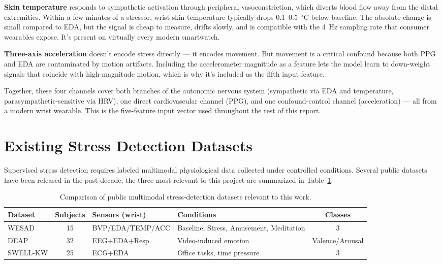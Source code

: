 \textbf{Skin temperature} responds to sympathetic activation through
peripheral vasoconstriction, which diverts blood flow away from the
distal extremities. Within a few minutes of a stressor, wrist skin
temperature typically drops 0.1--0.5~$^\circ$C below baseline. The
absolute change is small compared to EDA, but the signal is cheap
to measure, drifts slowly, and is compatible with the 4~Hz sampling
rate that consumer wearables expose. It's present on virtually every
modern smartwatch.

\textbf{Three-axis acceleration} doesn't encode stress directly --- it
encodes movement. But movement is a critical confound because both PPG
and EDA are contaminated by motion artifacts. Including the accelerometer
magnitude as a feature lets the model learn to down-weight signals that
coincide with high-magnitude motion, which is why it's included as the
fifth input feature.

Together, these four channels cover both branches of the autonomic
nervous system (sympathetic via EDA and temperature,
parasympathetic-sensitive via HRV), one direct cardiovascular channel
(PPG), and one confound-control channel (acceleration) --- all from a
modern wrist wearable. This is the five-feature input vector used
throughout the rest of this report.

\section{Existing Stress Detection Datasets}
\label{sec:lit-datasets}

Supervised stress detection requires labeled multimodal physiological
data collected under controlled conditions. Several public datasets
have been released in the past decade; the three most relevant to
this project are summarized in Table~\ref{tab:datasets}.

\begin{table}[H]
\centering
\caption{Comparison of public multimodal stress-detection datasets
relevant to this work.}
\label{tab:datasets}
\small
\begin{tabular}{lcp{2.5cm}p{4.0cm}c}
\toprule
\textbf{Dataset} & \textbf{Subjects} & \textbf{Sensors (wrist)} &
\textbf{Conditions} & \textbf{Classes} \\
\midrule
WESAD \citep{schmidt2018wesad} & 15 & BVP/EDA/TEMP/ACC & Baseline, Stress,
Amusement, Meditation & 3 \\
DEAP & 32 & EEG+EDA+Resp & Video-induced emotion & Valence/Arousal \\
SWELL-KW \citep{koldijk2014swell} & 25 & ECG+EDA & Office tasks,
time pressure & 3 \\
\bottomrule
\end{tabular}
\end{table}

